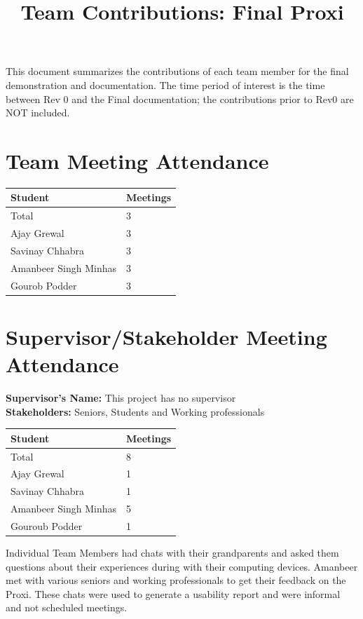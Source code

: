 \documentclass{article}
\title{Team Contributions: Final Proxi}
\author{\authname}
\date{}
\begin{document}
\maketitle

This document summarizes the contributions of each team member for the final
demonstration and documentation.  The time period of interest is the time
between Rev 0 and the Final documentation; the contributions prior to Rev0 are
NOT included.

\section{Team Meeting Attendance}

\begin{table}[H]
\centering
\begin{tabular}{ll}
\toprule
\textbf{Student} & \textbf{Meetings}\\
\midrule
Total & 3\\
Ajay Grewal & 3\\
Savinay Chhabra & 3\\
Amanbeer Singh Minhas & 3\\
Gourob Podder & 3\\
\bottomrule
\end{tabular}
\end{table}


\section{Supervisor/Stakeholder Meeting Attendance}


\noindent \textbf{Supervisor's Name: } This project has no supervisor \\
\noindent \textbf{Stakeholders: } Seniors, Students and Working professionals

\begin{table}[H]
\centering
\begin{tabular}{ll}
\toprule
\textbf{Student} & \textbf{Meetings}\\
\midrule
Total & 8\\
Ajay Grewal & 1\\
Savinay Chhabra & 1\\
Amanbeer Singh Minhas & 5\\
Gouroub Podder & 1\\
\bottomrule
\end{tabular}
\end{table}

Individual Team Members had chats with their grandparents and asked them questions
about their experiences during with their computing devices. Amanbeer met with various
seniors and working professionals to get their feedback on the Proxi. These chats were
used to generate a usability report and were informal and not scheduled meetings.
\end{document}
